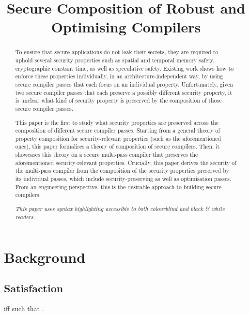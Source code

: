 \documentclass[a4paper,12pt]{article}
\title{Secure Composition of Robust and Optimising Compilers}
\begin{document}
\maketitle

\begin{abstract}
To ensure that secure applications do not leak their secrets, they are required to uphold several security properties such as spatial and temporal memory safety, cryptographic constant time, as well as speculative safety.
Existing work shows how to enforce these properties individually, in an architecture-independent way, by using secure compiler passes that each focus on an individual property.
Unfortunately, given two secure compiler passes that each preserve a possibly different security property, it is unclear what kind of security property is preserved by the composition of those secure compiler passes.

This paper is the first to study what security properties are preserved across the composition of different secure compiler passes.
Starting from a general theory of property composition for security-relevant properties (such as the aforementioned ones), this paper formalises a theory of composition of secure compilers.
Then, it showcases this theory on a secure multi-pass compiler that preserves the aforementioned security-relevant properties.
Crucially, this paper derives the security of the multi-pass compiler from the composition of the security properties preserved by its individual passes, which include security-preserving as well as optimisation passes.
% 
From an engineering perspective, this is the desirable approach to building secure compilers.
\begin{center}\small\it
	{This paper uses syntax highlighting accessible to both colourblind and black \& white readers.}
\end{center}
\end{abstract}

\appendix

\section{Background}

\subsection{Satisfaction}
 iff  such that .
\end{document}
